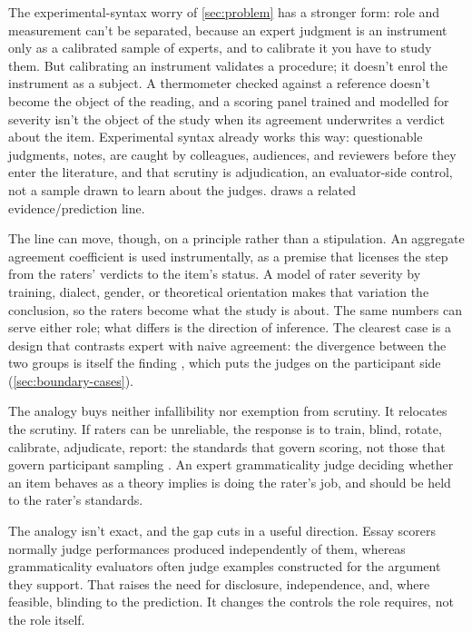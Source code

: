 The experimental-syntax worry of \autoref{sec:problem} has a stronger form: role and measurement can't be separated, because an expert judgment is an instrument only as a calibrated sample of experts, and to calibrate it you have to study them. But calibrating an instrument validates a procedure; it doesn't enrol the instrument as a subject. A thermometer checked against a reference doesn't become the object of the reading, and a scoring panel trained and modelled for severity isn't the object of the study when its agreement underwrites a verdict about the item. Experimental syntax already works this way: questionable judgments, \textcite{phillips2010} notes, are caught by colleagues, audiences, and reviewers before they enter the literature, and that scrutiny is adjudication, an evaluator-side control, not a sample drawn to learn about the judges. \textcite{riemer2009} draws a related evidence/prediction line.

The line can move, though, on a principle rather than a stipulation. An aggregate agreement coefficient is used instrumentally, as a premise that licenses the step from the raters' verdicts to the item's status. A model of rater severity by training, dialect, gender, or theoretical orientation makes that variation the conclusion, so the raters become what the study is about. The same numbers can serve either role; what differs is the direction of inference. The clearest case is a design that contrasts expert with naive agreement: the divergence between the two groups is itself the finding \citep{dabrowska2010}, which puts the judges on the participant side (\autoref{sec:boundary-cases}).

The analogy buys neither infallibility nor exemption from scrutiny. It relocates the scrutiny. If raters can be unreliable, the response is to train, blind, rotate, calibrate, adjudicate, report: the standards that govern scoring, not those that govern participant sampling \citep{aera2014standards}. An expert grammaticality judge deciding whether an item behaves as a theory implies is doing the rater's job, and should be held to the rater's standards.

The analogy isn't exact, and the gap cuts in a useful direction. Essay scorers normally judge performances produced independently of them, whereas grammaticality evaluators often judge examples constructed for the argument they support. That raises the need for disclosure, independence, and, where feasible, blinding to the prediction. It changes the controls the role requires, not the role itself.

